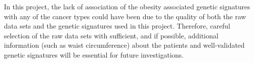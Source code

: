 In this project, the lack of association of the obesity associated genetic signatures with any of the cancer types could have been due to the quality of both the raw data sets and the genetic signatures used in this project.
Therefore, careful selection of the raw data sets with sufficient, and if possible, additional information (such as waist circumference) about the patients and well-validated genetic signatures will be essential for future investigations.

